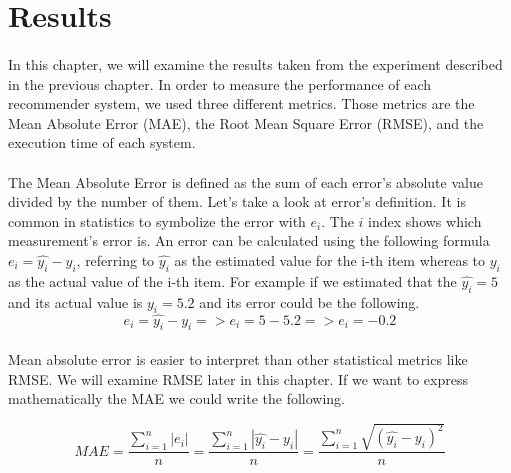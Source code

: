 \newpage
\section{Results}

\paragraph{} In this chapter, we will examine the results taken from the experiment described in the previous chapter. 
In order to measure the performance of each recommender system, we used three different metrics. Those metrics are the Mean Absolute Error (MAE), the Root Mean Square Error (RMSE), and the execution time of each system.

\paragraph{} The Mean Absolute Error is defined as the sum of each error's absolute value divided by the number of them. Let's take a look
at error's definition. It is common in statistics to symbolize the error with $e_i$. The $i$ index shows which measurement's error is. An error can be calculated using the following formula $e_i = \widehat{y_i} - y_i$, referring to $\widehat{y_{i}}$ as the estimated value for the i-th item whereas to $y_i$ as the actual value of the i-th item. For example if we estimated that the $\widehat{y_i} = 5$ and its actual value is $y_i = 5.2$ and its error could be the following.
\begin{equation}
e_i = \widehat{y_i} - y_i => e_i = 5 - 5.2  => e_i = -0.2
\end{equation}

\paragraph{} Mean absolute error is easier to interpret than other statistical metrics like RMSE. We will examine RMSE later in this chapter. If we want to express mathematically the MAE we could write the following.

\begin{equation}
MAE = \frac{\sum_{i=1}^{n}{|e_i|}}{n} =
\frac{\sum_{i=1}^{n}{|\widehat{y_{i}}-y_{i}|} }{n} =
\frac{\sum_{i=1}^{n}\sqrt{{(\widehat{y_{i}}-y_{i})}^{2}}}{n}
\end{equation}

